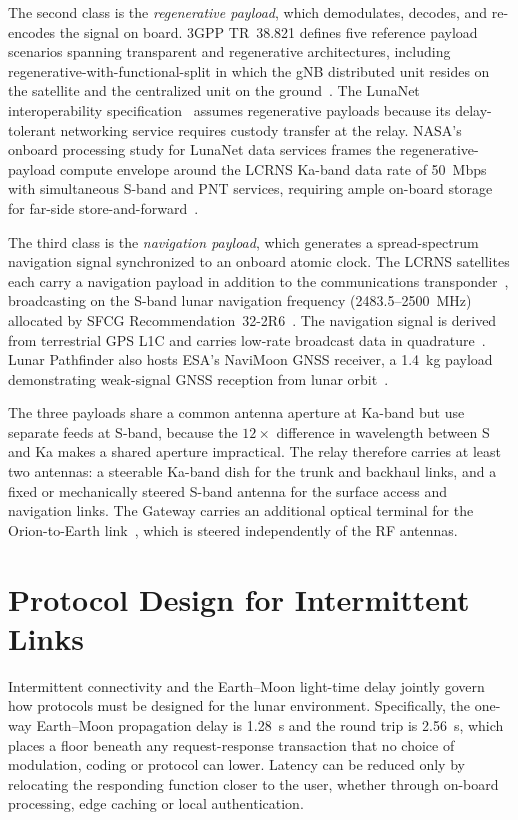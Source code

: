 \documentclass[11pt,a4paper]{article}
\begin{document}
The second class is the \emph{regenerative payload}, which demodulates, decodes, and re-encodes the signal on board. 3GPP TR~38.821 defines five reference payload scenarios spanning transparent and regenerative architectures, including regenerative-with-functional-split in which the gNB distributed unit resides on the satellite and the centralized unit on the ground~\cite{3gpp_tr_38821}. The LunaNet interoperability specification~\cite{lnis_v5} assumes regenerative payloads because its delay-tolerant networking service requires custody transfer at the relay. NASA's onboard processing study for LunaNet data services frames the regenerative-payload compute envelope around the LCRNS Ka-band data rate of \SI{50}{Mbps} with simultaneous S-band and PNT services, requiring ample on-board storage for far-side store-and-forward~\cite{nasa_onboard_lunanet}.

The third class is the \emph{navigation payload}, which generates a spread-spectrum navigation signal synchronized to an onboard atomic clock. The LCRNS satellites each carry a navigation payload in addition to the communications transponder~\cite{lcrns_ref_const}, broadcasting on the S-band lunar navigation frequency (\SI{2483.5}{}--\SI{2500}{MHz}) allocated by SFCG Recommendation~32-2R6~\cite{sfcg_rec32}. The navigation signal is derived from terrestrial GPS L1C and carries low-rate broadcast data in quadrature~\cite{gramling_lunanet_pnt}. Lunar Pathfinder also hosts ESA's NaviMoon GNSS receiver, a \SI{1.4}{kg} payload demonstrating weak-signal GNSS reception from lunar orbit~\cite{davies_pathfinder_2023}.

The three payloads share a common antenna aperture at Ka-band but use separate feeds at S-band, because the $12\times$ difference in wavelength between S and Ka makes a shared aperture impractical. The relay therefore carries at least two antennas: a steerable Ka-band dish for the trunk and backhaul links, and a fixed or mechanically steered S-band antenna for the surface access and navigation links. The Gateway carries an additional optical terminal for the Orion-to-Earth link~\cite{gateway_comm}, which is steered independently of the RF antennas.


\section{Protocol Design for Intermittent Links}
\label{sec:protocol}

Intermittent connectivity and the Earth--Moon light-time delay jointly govern how protocols must be designed for the lunar environment. Specifically, the one-way Earth--Moon propagation delay is \SI{1.28}{\second} and the round trip is \SI{2.56}{\second}, which places a floor beneath any request-response transaction that no choice of modulation, coding or protocol can lower. Latency can be reduced only by relocating the responding function closer to the user, whether through on-board processing, edge caching or local authentication.
\end{document}
